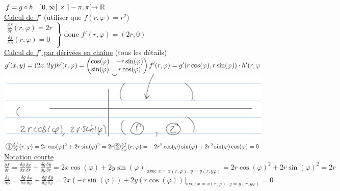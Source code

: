 \documentclass[12pt,a4paper]{article}
\begin{document}
\begin{enumerate}
			$f = g\circ h\quad ]0,\infty[\ \times\ ]-\pi, \pi[ \to \R$\\
			\uline{Calcul de $f'$} (utiliser que $f(r,\varphi) = r^2$)\\
			$\left.\begin{array}{l}
				\frac{\delta f}{\delta r}(r,\varphi) = 2r\\
				\frac{\delta f}{\delta \varphi}(r,\varphi) = 0
			\end{array}\right\}$ donc $f'(r,\varphi) = (2r,0)$\\
			\uline{Calcul de $f'$ par dérivées en chaîne} (tous les détails)\\
			$g'(x,y) = (2x,2y)\\
			h'(r,\varphi) =
			\begin{pmatrix}
				\cos(\varphi) & -r\sin(\varphi)\\
				\sin(\varphi) & r\cos(\varphi)
			\end{pmatrix}\\
			f'(r,\varphi) = g'(r\cos(\varphi),r\sin(\varphi)) \cdot h'(r,\varphi$\\
			\includegraphics[scale=0.5]{images/repere_matrice_h}\\
			$\circled{1} \frac{\delta f}{\delta r}(r,\varphi) = 2r\cos(\varphi)^2 + 2r\sin(\varphi)^2 = 2r\\
			\circled{2} \frac{\delta f}{\delta \varphi}(r,\varphi) = -2r^2 \cos(\varphi) \sin(\varphi)+ 2r^2\sin(\varphi)\cos(\varphi) = 0$\\
			\uline{Notation courte}\\
			$\frac{\delta f}{\delta r} = \frac{\delta g}{\delta x}\frac{\delta x}{\delta r} + \frac{\delta g}{\delta y}\frac{\delta y}{\delta r} = 2x\cos(\varphi)+2y\sin(\varphi)|_{\text{avec } x=x(r,\varphi),\, y=y(r,y\varphi)} = 2r\cos(\varphi)^2+2r\sin(\varphi)^2 = 2r$\\
			$\frac{\delta f}{\delta \varphi} = \frac{\delta g}{\delta x}\frac{\delta x}{\delta \varphi} + \frac{\delta g}{\delta y}\frac{\delta y}{\delta \varphi} = 2x(-r\sin(\varphi)) + 2y(r\cos(\varphi))|_{\text{avec } x=x(r,\varphi),\, y=y(r,y\varphi)} = 0$
\end{enumerate}
\end{document}
